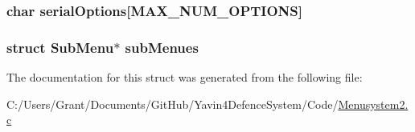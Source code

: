 \hypertarget{structSubMenu_adcfcbb5b5340baf34c70fb8f4cc66f72}{
\subsubsection[{serial\+Options}]{\setlength{\rightskip}{0pt plus 5cm}char serial\+Options\mbox{[}{\bf M\+A\+X\+\_\+\+N\+U\+M\+\_\+\+O\+P\+T\+I\+O\+N\+S}\mbox{]}}}\label{structSubMenu_adcfcbb5b5340baf34c70fb8f4cc66f72}
\hypertarget{structSubMenu_a915aa121e09e4c3f914dc59727f390e3}{
\subsubsection[{sub\+Menues}]{\setlength{\rightskip}{0pt plus 5cm}struct {\bf Sub\+Menu}$\ast$ sub\+Menues}}\label{structSubMenu_a915aa121e09e4c3f914dc59727f390e3}


The documentation for this struct was generated from the following file\+:\begin{DoxyCompactItemize}
\item 
C\+:/\+Users/\+Grant/\+Documents/\+Git\+Hub/\+Yavin4\+Defence\+System/\+Code/\hyperlink{Menusystem2_8c}{Menusystem2.\+c}\end{DoxyCompactItemize}

